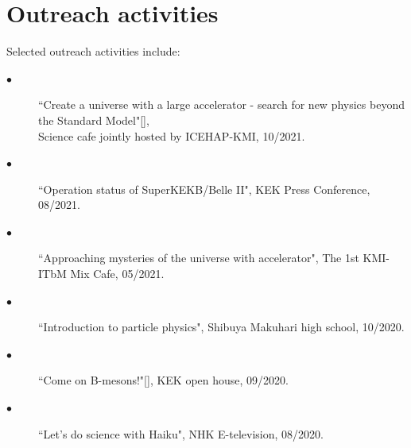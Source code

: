 \documentclass[12pt]{article}
\begin{document}
{\section*{\large{Outreach activities}} 
{\footnotesize
Selected outreach activities include:
\begin{description}
\item[$\bullet$]  {``Create a universe with a large accelerator - search for new physics beyond the Standard Model"[],\\ 
\hspace{-0.25in}Science cafe jointly hosted by ICEHAP-KMI, 10/2021.} 
\item[$\bullet$]  {``Operation status of SuperKEKB/Belle II", KEK Press Conference, 08/2021.} 
\item[$\bullet$]  {``Approaching mysteries of the universe with accelerator", The 1st KMI-ITbM Mix Cafe, 05/2021.} 
\item[$\bullet$]  {``Introduction to particle physics", Shibuya Makuhari high school, 10/2020.} 
\item[$\bullet$]  {``Come on B-mesons!"[], KEK open house, 09/2020.} 
\item[$\bullet$]  {``Let's do science with Haiku", NHK E-television, 08/2020.} 
\end{description}
}

}
\end{document}
